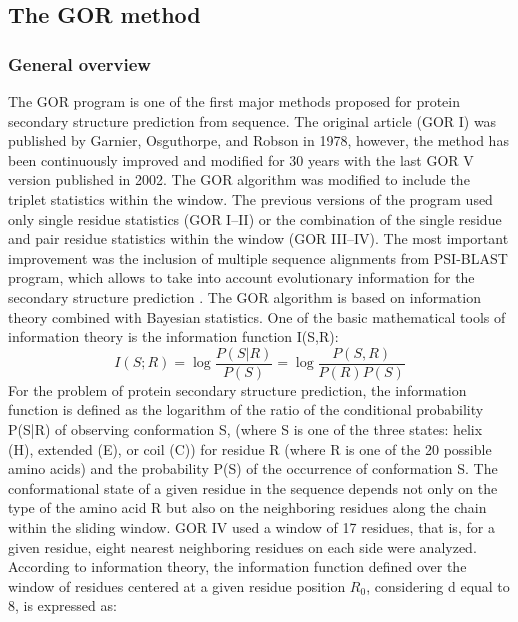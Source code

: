 \documentclass[nocrop]{bioinfo}
\begin{document}
\begin{methods}
\subsection{The GOR method}
\subsubsection{General overview}
The GOR program is one of the first major methods proposed for protein secondary structure prediction from sequence. The original article (GOR I) was published by Garnier, Osguthorpe, and Robson in 1978, however, the method has been continuously improved and modified for 30 years with the last GOR V version published in 2002. The GOR algorithm was modified to include the triplet statistics within the window. The previous versions of the program used only single residue statistics (GOR I–II) or the combination of the single residue and pair residue statistics within the window (GOR III–IV). The most important improvement was the inclusion of multiple sequence alignments from PSI-BLAST program, which allows to take into account evolutionary information for the secondary structure prediction \citep{kloczkowski2002combining}.
The GOR algorithm is based on information theory combined with Bayesian statistics. One of the basic mathematical tools of information theory is the information function I(S,R):
\begin{equation}\label{eq:01}
    I(S; R) = \log \frac{P(S|R)}{P(S)} = \log \frac{P(S, R)}{P(R)P(S)}
\end{equation}
For the problem of protein secondary structure prediction, the information function is defined as the logarithm of the ratio of the conditional probability P(S|R) of observing conformation S, (where S is one of the three states: helix (H), extended (E), or coil (C)) for residue R (where R is one of the 20 possible amino acids) and the probability P(S) of the occurrence of conformation S. The conformational state of a given residue in the sequence depends not only on the type of the amino acid R but also on the neighboring residues along the chain within the sliding window. GOR IV used a window of 17 residues, that is, for a given residue, eight nearest neighboring residues on each side were analyzed. According to information theory, the information function defined over the window of residues centered at a given residue position $R_0$, considering d equal to 8, is expressed as:
\begin{equation}\label{eq:02}
\begin{split}

\end{split}
\end{equation}
\end{methods}
\end{document}
